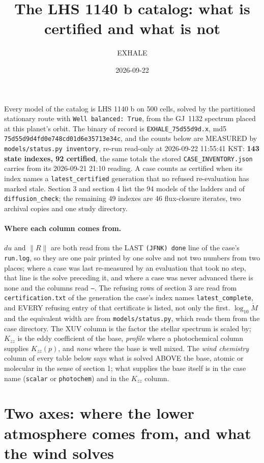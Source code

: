 \documentclass[11pt]{my_memo}
\title{The LHS 1140 b catalog: what is certified and what is not}
\author{EXHALE}
\date{2026-09-22}
\begin{document}
\maketitle

\noindent
Every model of the catalog is LHS 1140 b on 500 cells, solved by the
partitioned stationary route with \texttt{Well balanced: True}, from the
GJ~1132 spectrum placed at this planet's orbit. The binary of record is
\texttt{EXHALE\_75d55d9d.x}, md5 \texttt{75d55d9d4fd0e748cd01d6e35713e34c},
and the counts below are MEASURED by \texttt{models/status.py inventory},
re-run read-only at 2026-09-22 11:55:41 KST: \textbf{143 state indexes, 92
certified}, the same totals the stored \texttt{CASE\_INVENTORY.json} carries
from its 2026-09-21 21:10 reading. A case counts as certified when its index
names a \texttt{latest\_certified} generation that no refused re-evaluation
has marked stale. Section 3 and section 4 list the 94 models of the ladders
and of \texttt{diffusion\_check}; the remaining 49 indexes are 46
flux-closure iterates, two archival copies and one study directory.

\paragraph{Where each column comes from.} $du$ and $\lVert R\rVert$ are
both read from the LAST \texttt{(JFNK) done} line of the case's
\texttt{run.log}, so they are one pair printed by one solve and not two
numbers from two places; where a case was last re-measured by an evaluation
that took no step, that line is the solve preceding it, and where a case was
never advanced there is none and the columns read \texttt{--}. The refusing
rows of section 3 are read from \texttt{certification.txt} of the generation
the case's index names \texttt{latest\_complete}, and EVERY refusing entry of
that certificate is listed, not only the first. $\log_{10}\dot{M}$ and the
equivalent width are from \texttt{models/status.py}, which reads them from
the case directory. The XUV column is the factor the stellar spectrum is scaled
by; $K_{zz}$ is the eddy coefficient of the base, \emph{profile} where a
photochemical column supplies $K_{zz}(p)$, and \emph{none} where the base is
well mixed. The \emph{wind chemistry} column of every table below says what
is solved ABOVE the base, atomic or molecular in the sense of section 1; what
supplies the base itself is in the case name (\texttt{scalar} or
\texttt{photochem}) and in the $K_{zz}$ column.

\section{Two axes: where the lower atmosphere comes from, and what the wind solves}
\end{document}
